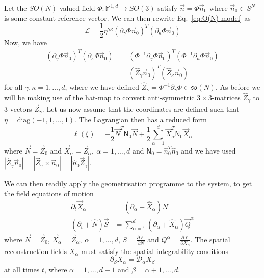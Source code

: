 Let the $SO(N)$-valued field $\Phi : \mathbb{M}^{1,d} \to SO(3)$ satisfy $\vec{n} = \Phi \vec{n}_0$ where $\vec{n}_0 \in S^N$ is some constant reference vector. We can then rewrite Eq.~\ref{eq:O(N) model} as
\begin{equation}
\mathcal{L} = \frac{1}{2} \eta^{\gamma \kappa} (\partial_\gamma \Phi \vec{n}_0)^T (\partial_\kappa \Phi  \vec{n}_0) 
\end{equation}
Now, we have
\begin{equation}
\begin{aligned}
(\partial_\gamma \Phi \vec{n}_0)^T (\partial_\kappa \Phi  \vec{n}_0) & = (\Phi^{-1} \partial_\gamma \Phi \vec{n}_0)^T (\Phi^{-1} \partial_\kappa \Phi  \vec{n}_0) \\
& = (\hat{Z}_\gamma \vec{n}_0)^T (\hat{Z}_\kappa \vec{n}_0)
\end{aligned}
\end{equation}
for all $\gamma,\kappa = 1,\dots, d$, where we have defined $\hat{Z}_\gamma = \Phi^{-1} \partial_\gamma \Phi \in \mathfrak{so}(N)$. As before we will  be making use of the hat-map to convert anti-symmetric $3\times 3$-matrices $\hat{Z}_\gamma$ to $3$-vectors $\vec{Z}_\gamma$. Let us now assume that the coordinates are defined such that $\eta = \text{diag}(-1, 1, \dots, 1)$. The Lagrangian then has a reduced form
\begin{equation}
\ell(\xi) = - \frac{1}{2} \vec{N}^T \mathsf{N}_0 \vec{N} + \frac{1}{2} \sum_{\alpha=1}^d \vec{X}_\alpha^T \mathsf{N}_0 \vec{X}_\alpha
\end{equation}
where $\vec{N} = \vec{Z}_0$ and $\vec{X}_\alpha = \vec{Z}_\alpha,\ \alpha = 1, \dots, d$ and $\mathsf{N}_0 = \hat{n}_0^T \hat{n}_0$ and we have used $|\hat{Z}_\gamma \vec{n}_0 | = |\vec{Z}_\gamma \times  \vec{n}_0 | = | \hat{n}_0 \vec{Z}_\gamma  |$.

We can then readily apply the geometrisation programme to the system, to get the field equations of motion
\begin{subequations} 
\begin{align}
\partial_t \vec{X}_\alpha & = (\partial_\alpha + \hat{X}_\alpha) N \\
(\partial_t + \hat{N}) \vec{S} & = \sum_{\alpha=1}^d (\partial_\alpha + \hat{X}_\alpha) \vec{Q}^\alpha  \label{eq:dynamic field equations}
\end{align}
\end{subequations}
where $\vec{N} = \vec{Z}_0$, $\vec{X}_\alpha = \vec{Z}_\alpha,\ \alpha = 1, \dots, d$, $S = \frac{\partial \ell}{\partial N}$ and $Q^\alpha = \frac{\partial \ell}{\partial X_\alpha}$. The spatial reconstruction fields $X_\alpha$ must satisfy the spatial integrability conditions
\begin{equation}
\partial_\beta X_\alpha = \mathcal{D}_\alpha X_\beta
\end{equation}
at all times $t$, where $\alpha = 1, \dots, d-1$ and $\beta = \alpha+1, \dots, d$.

